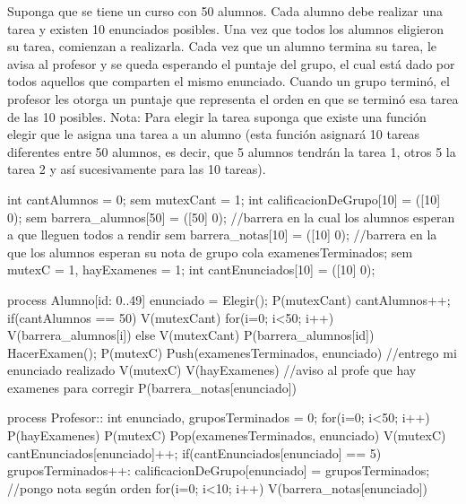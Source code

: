 Suponga que se tiene un curso con 50 alumnos. Cada alumno debe realizar una tarea y
existen 10 enunciados posibles. Una vez que todos los alumnos eligieron su tarea,
comienzan a realizarla. Cada vez que un alumno termina su tarea, le avisa al profesor y se
queda esperando el puntaje del grupo, el cual está dado por todos aquellos que comparten
el mismo enunciado. Cuando un grupo terminó, el profesor les otorga un puntaje que
representa el orden en que se terminó esa tarea de las 10 posibles.
    Nota: Para elegir la tarea suponga que existe una función
    elegir que le asigna una tarea a un alumno (esta función asignará 10 tareas diferentes entre 50 alumnos, es decir, que 5
    alumnos tendrán la tarea 1, otros 5 la tarea 2 y así sucesivamente para las 10 tareas).

int cantAlumnos = 0;
sem mutexCant = 1;
int calificacionDeGrupo[10] = ([10] 0);
sem barrera_alumnos[50] = ([50] 0); //barrera en la cual los alumnos esperan a que lleguen todos a rendir
sem barrera_notas[10] = ([10] 0); //barrera en la que los alumnos esperan su nota de grupo
cola examenesTerminados;
sem mutexC = 1, hayExamenes = 1;
int cantEnunciados[10] = ([10] 0);

process Alumno[id: 0..49]
{
    enunciado = Elegir();
    P(mutexCant)
    cantAlumnos++;
    if(cantAlumnos == 50){
        V(mutexCant)
        for(i=0; i<50; i++) V(barrera_alumnos[i])
    } else {
        V(mutexCant)
        P(barrera_alumnos[id])
    }
    HacerExamen();
    P(mutexC)
    Push(examenesTerminados, enunciado) //entrego mi enunciado realizado
    V(mutexC)
    V(hayExamenes) //aviso al profe que hay examenes para corregir
    P(barrera_notas[enunciado])
}

process Profesor::
{
    int enunciado, gruposTerminados = 0;
    for(i=0; i<50; i++){
        P(hayExamenes)    
        P(mutexC)
        Pop(examenesTerminados, enunciado)
        V(mutexC)
        cantEnunciados[enunciado]++;
        if(cantEnunciados[enunciado] == 5){
            gruposTerminados++:
            calificacionDeGrupo[enunciado] = gruposTerminados; //pongo nota según orden
            for(i=0; i<10; i++) V(barrera_notas[enunciado])
        }
    }
}